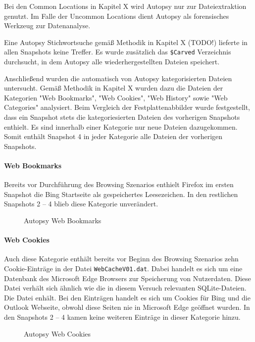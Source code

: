 Bei den Common Locations in Kapitel X wird Autopsy nur zur Dateiextraktion genutzt. Im Falle der Uncommon Locations dient Autopsy als forensisches Werkzeug zur Datenanalyse.

Eine Autopsy Stichwortsuche gemäß Methodik in Kapitel X (TODO!) lieferte in allen Snapshots keine Treffer. Es wurde zusätzlich das \texttt{\$Carved} Verzeichnis durchsucht, in dem Autopsy alle wiederhergestellten Dateien speichert.

Anschließend wurden die automatisch von Autopsy kategorisierten Dateien untersucht. Gemäß Methodik in Kapitel X wurden dazu die Dateien der Kategorien "Web Bookmarks", "Web Cookies", "Web History" sowie "Web Categories" analysiert.
Beim Vergleich der Festplattenabbilder wurde festgestellt, dass ein Snapshot stets die kategoriesierten Dateien des vorherigen Snapshots enthielt. Es sind innerhalb einer Kategorie nur neue Dateien dazugekommen. Somit enthält Snapshot 4 in jeder Kategorie alle Dateien der vorherigen Snapshots.

\paragraph*{Web Bookmarks}

Bereits vor Durchführung des Browsing Szenarios enthielt Firefox im ersten Snapshot die Bing Startseite als gespeichertes Leesezeichen. In den restlichen Snapshots 2 -- 4 blieb diese Kategorie unverändert.

\begin{figure}[h!]
	\centerline{}
	\label{chart:final-criteria}  
	\caption{Autopsy Web Bookmarks}
\end{figure}

\paragraph*{Web Cookies}
Auch diese Kategorie enthält bereits vor Beginn des Browsing Szenarios zehn Cookie-Einträge in der Datei \texttt{WebCacheV01.dat}. Dabei handelt es sich um eine Datenbank des Microsoft Edge Browsers zur Speicherung von Nutzerdaten. Diese Datei verhält sich ähnlich wie die in diesem Versuch relevanten SQLite-Dateien. Die Datei enhält. Bei den Einträgen handelt es sich um Cookies für Bing und die Outlook Webseite, obwohl diese Seiten nie in Microsoft Edge geöffnet wurden. In den Snapshots 2 -- 4 kamen keine weiteren Einträge in dieser Kategorie hinzu.
\begin{figure}[h!]
	\centerline{}
	\label{chart:final-criteria}  
	\caption{Autopsy Web Cookies}
\end{figure}

